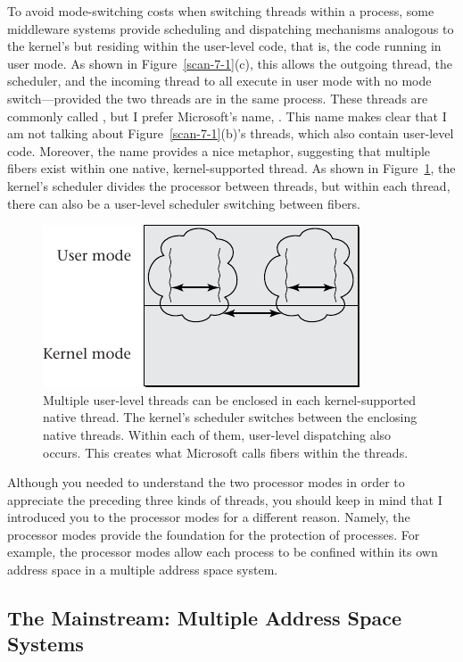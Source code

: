 To avoid mode-switching costs when switching threads within a process,
some middleware systems provide scheduling and dispatching mechanisms
analogous to the kernel's but residing within the user-level code,
that is, the code running in user mode.  As
shown in Figure~\ref{scan-7-1}(c), this allows the outgoing thread,
the scheduler, and the incoming thread to all execute in user mode
with no mode switch---provided the two threads are in the same
process.  These threads are commonly called
, but I prefer Microsoft's name,
.  This name makes clear that I am not talking about
Figure~\ref{scan-7-1}(b)'s threads, which also contain user-level code.  Moreover, the
name provides a nice
metaphor, suggesting that multiple fibers exist within one native,
kernel-supported thread.  As shown in Figure~\ref{scan-7-2}, the
kernel's scheduler divides the processor between threads, but within
each thread, there can also be a user-level scheduler switching
between fibers.
\begin{figure}
\centerline{\includegraphics{hail_f0709}}
\caption{Multiple user-level threads can be enclosed in each
  kernel-supported native thread. The kernel's scheduler switches
  between the enclosing native threads.  Within each of them,
  user-level dispatching also occurs.  This creates
  what Microsoft calls fibers within the threads.}
\label{scan-7-2}
\end{figure}

Although you needed to understand the two processor modes in order to
appreciate the preceding three kinds of threads, you should keep in
mind that I introduced you to the processor modes for a different
reason.  Namely, the processor modes provide the foundation for the
protection of processes.  For example, the processor modes allow each
process to be confined within its own address space in a multiple
address space system.

\subsection{The Mainstream: Multiple Address Space Systems}\label{multiple-address-space-subsection}

